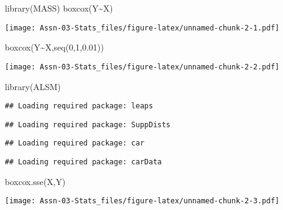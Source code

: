 \documentclass[
]{article}
\newenvironment{Shaded}{\begin{snugshade}}{\end{snugshade}}
\newcommand{\DecValTok}[1]{\textcolor[rgb]{0.00,0.00,0.81}{#1}}
\newcommand{\FloatTok}[1]{\textcolor[rgb]{0.00,0.00,0.81}{#1}}
\newcommand{\FunctionTok}[1]{\textcolor[rgb]{0.00,0.00,0.00}{#1}}
\newcommand{\NormalTok}[1]{#1}
\newcommand{\SpecialCharTok}[1]{\textcolor[rgb]{0.00,0.00,0.00}{#1}}
\newcommand{\StringTok}[1]{\textcolor[rgb]{0.31,0.60,0.02}{#1}}
\begin{document}
\begin{Shaded}
\begin{Highlighting}[]
\FunctionTok{library}\NormalTok{(MASS)}
\FunctionTok{boxcox}\NormalTok{(Y}\SpecialCharTok{\textasciitilde{}}\NormalTok{X)}
\end{Highlighting}
\end{Shaded}

\texttt{[image: Assn-03-Stats\_files/figure-latex/unnamed-chunk-2-1.pdf]}

\begin{Shaded}
\begin{Highlighting}[]
\FunctionTok{boxcox}\NormalTok{(Y}\SpecialCharTok{\textasciitilde{}}\NormalTok{X,}\FunctionTok{seq}\NormalTok{(}\DecValTok{0}\NormalTok{,}\DecValTok{1}\NormalTok{,}\FloatTok{0.01}\NormalTok{))}
\end{Highlighting}
\end{Shaded}

\texttt{[image: Assn-03-Stats\_files/figure-latex/unnamed-chunk-2-2.pdf]}

\begin{Shaded}
\begin{Highlighting}[]
\FunctionTok{library}\NormalTok{(}\StringTok{\textquotesingle{}ALSM\textquotesingle{}}\NormalTok{)}
\end{Highlighting}
\end{Shaded}

\begin{verbatim}
## Loading required package: leaps
\end{verbatim}

\begin{verbatim}
## Loading required package: SuppDists
\end{verbatim}

\begin{verbatim}
## Loading required package: car
\end{verbatim}

\begin{verbatim}
## Loading required package: carData
\end{verbatim}

\begin{Shaded}
\begin{Highlighting}[]
\FunctionTok{boxcox.sse}\NormalTok{(X,Y)}
\end{Highlighting}
\end{Shaded}

\texttt{[image: Assn-03-Stats\_files/figure-latex/unnamed-chunk-2-3.pdf]}
\end{document}
